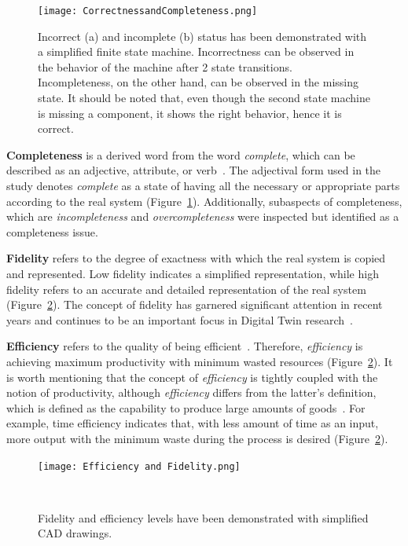 \documentclass{llncs}
\begin{document}
    \begin{figure}[htbp]
        \centering
        \texttt{[image: CorrectnessandCompleteness.png]}
        \caption{Incorrect (a) and incomplete (b) status has been demonstrated with a simplified finite state machine. Incorrectness can be observed in the behavior 
        of the machine after 2 state transitions. Incompleteness, on the other hand, can be observed in the missing state. It should be noted that, even though the second state machine is missing a 
        component, it shows the right behavior, hence it is correct.}\label{fig:CorrectnessAndCompleteness}
    \end{figure}

    \textbf{Completeness} is a derived word from the word  \textit{complete}, which can be described as an adjective, attribute, or verb~\cite{OxfordDictionary}. 
    The adjectival form used in the study denotes \textit{complete} as a state of having all the necessary or appropriate parts according to the real system 
    (Figure~\ref{fig:CorrectnessAndCompleteness}). Additionally, subaspects of completeness, which are \textit{incompleteness} and \textit{overcompleteness} 
    were inspected but identified as a completeness issue.  

    \textbf{Fidelity} refers to the degree of exactness with which the real system is copied and represented. 
    Low fidelity indicates a simplified representation, 
    while high fidelity refers to an accurate and detailed representation of the real system~\cite{Review2} (Figure~\ref{fig:EfficiencyandFidelity}). 
    The concept of fidelity has garnered significant attention in recent
    years and continues to be an important focus in Digital Twin research~\cite{Review2,Review1}.

    \textbf{Efficiency} refers to the quality of being efficient~\cite{OxfordDictionary}. 
    Therefore, \textit{efficiency} is achieving maximum productivity with minimum wasted resources (Figure~\ref{fig:EfficiencyandFidelity}). 
    It is worth mentioning that the concept of \textit{efficiency} is tightly coupled with the notion of productivity, 
    although \textit{efficiency} differs from the latter's definition, which is defined as the capability to produce large amounts of goods~\cite{OxfordDictionary}.  
    For example, time efficiency indicates that,  with less amount of time as an input, more output with the minimum waste during the process is desired (Figure~\ref{fig:EfficiencyandFidelity}).
    \begin{figure}[htbp]
        \centering
        \texttt{[image: Efficiency and Fidelity.png]}
        \caption{Fidelity and efficiency levels have been demonstrated with simplified CAD drawings.}~\label{fig:EfficiencyandFidelity}
    \end{figure}
\end{document}
